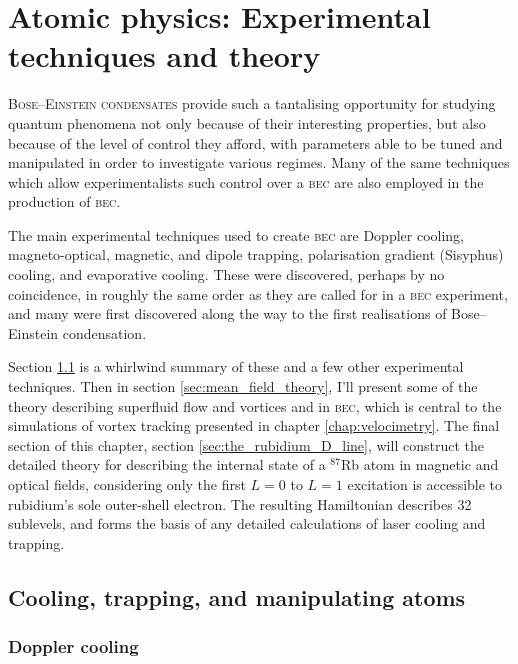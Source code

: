 \chapter{Atomic physics: Experimental techniques and theory}\label{chap:atomic_physics}

\lettrine[lines=3]{B}{ose--Einstein condensates} provide such a tantalising opportunity for studying quantum phenomena not only because of their interesting properties, but also because of the level of control they afford, with parameters able to be tuned and manipulated in order to investigate various regimes. Many of the same techniques which allow experimentalists such control over a \textsc{bec} are also employed in the production of \textsc{bec}.

The main experimental techniques used to create \textsc{bec} are Doppler cooling, magneto-optical, magnetic, and dipole trapping, polarisation gradient (Sisyphus) cooling, and evaporative cooling. These were discovered, perhaps by no coincidence, in roughly the same order as they are called for in a \textsc{bec} experiment, and many were first discovered along the way to the first realisations of Bose--Einstein condensation.

Section \ref{sec:cooling_and_trapping} is a whirlwind summary of these and a few other experimental techniques. Then in section \ref{sec:mean_field_theory}, I'll present some of the theory describing superfluid flow and vortices and in \textsc{bec}, which is central to the simulations of vortex tracking presented in chapter \ref{chap:velocimetry}. The final section of this chapter, section \ref{sec:the_rubidium_D_line}, will construct the detailed theory for describing the internal state of a $^{87}$Rb atom in magnetic and optical fields, considering only the first $L=0$ to $L=1$ excitation is accessible to rubidium's  sole outer-shell electron. The resulting Hamiltonian describes 32 sublevels, and forms the basis of any detailed calculations of laser cooling and trapping.

\section{Cooling, trapping, and manipulating atoms}\label{sec:cooling_and_trapping}

\subsection{Doppler cooling}\label{sec:doppler_cooling}

